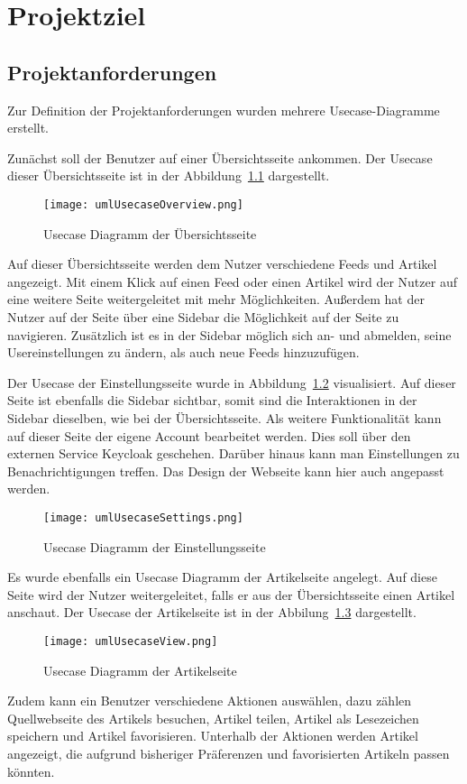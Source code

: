 
\chapter{Projektziel}

\section{Projektanforderungen}
Zur Definition der Projektanforderungen wurden mehrere Usecase-Diagramme erstellt.

Zunächst soll der Benutzer auf einer Übersichtsseite ankommen.
Der Usecase dieser Übersichtsseite ist in der Abbildung~\ref{fig:usecaseOverview} dargestellt.
\begin{figure}
    \texttt{[image: umlUsecaseOverview.png]}
    \caption{Usecase Diagramm der Übersichtsseite}
    \label{fig:usecaseOverview}
\end{figure}
Auf dieser Übersichtsseite werden dem Nutzer verschiedene Feeds und Artikel angezeigt. Mit einem Klick auf einen Feed oder einen Artikel wird
der Nutzer auf eine weitere Seite weitergeleitet mit mehr Möglichkeiten. Außerdem hat der Nutzer auf der Seite über eine Sidebar die Möglichkeit
auf der Seite zu navigieren. Zusätzlich ist es in der Sidebar möglich  sich an- und abmelden, seine Usereinstellungen zu ändern, als auch neue Feeds
hinzuzufügen. 

Der Usecase der Einstellungsseite wurde in Abbildung~\ref{fig:usecaseSettings} visualisiert.
Auf dieser Seite ist ebenfalls die Sidebar sichtbar, somit sind die Interaktionen in der Sidebar dieselben, wie
bei der Übersichtsseite. Als weitere Funktionalität kann auf dieser Seite der eigene Account bearbeitet werden.
Dies soll über den externen Service Keycloak geschehen. Darüber hinaus
kann man Einstellungen zu Benachrichtigungen treffen. Das Design der
Webseite kann hier auch angepasst werden.
\begin{figure}
    \texttt{[image: umlUsecaseSettings.png]}
    \caption{Usecase Diagramm der Einstellungsseite}
    \label{fig:usecaseSettings}
\end{figure}


Es wurde ebenfalls ein Usecase Diagramm der Artikelseite angelegt. Auf diese Seite
wird der Nutzer weitergeleitet, falls er aus der Übersichtsseite einen Artikel anschaut.
Der Usecase der Artikelseite ist in der Abbilung~\ref{fig:usecaseView} dargestellt.
\begin{figure}
    \texttt{[image: umlUsecaseView.png]}
    \caption{Usecase Diagramm der Artikelseite}
    \label{fig:usecaseView}
\end{figure}
Zudem kann ein Benutzer verschiedene Aktionen auswählen, dazu zählen Quellwebseite des Artikels besuchen, Artikel teilen, Artikel als 
Lesezeichen speichern und Artikel favorisieren. Unterhalb der Aktionen werden Artikel angezeigt, die aufgrund bisheriger Präferenzen und 
favorisierten Artikeln passen könnten.

